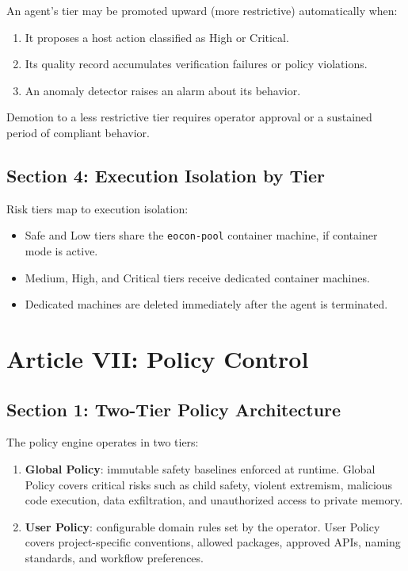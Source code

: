 \documentclass[12pt,letterpaper]{article}
\begin{document}
An agent's tier may be promoted upward (more restrictive) automatically when:

\begin{enumerate}
    \item It proposes a host action classified as High or Critical.
    \item Its quality record accumulates verification failures or policy violations.
    \item An anomaly detector raises an alarm about its behavior.
\end{enumerate}

Demotion to a less restrictive tier requires operator approval or a sustained period of compliant behavior.

\subsection{Section 4: Execution Isolation by Tier}

Risk tiers map to execution isolation:

\begin{itemize}
    \item Safe and Low tiers share the \texttt{eocon-pool} container machine, if container mode is active.
    \item Medium, High, and Critical tiers receive dedicated container machines.
    \item Dedicated machines are deleted immediately after the agent is terminated.
\end{itemize}

\section{Article VII: Policy Control}
\label{art:policy}

\subsection{Section 1: Two-Tier Policy Architecture}

The policy engine operates in two tiers:

\begin{enumerate}
    \item \textbf{Global Policy}: immutable safety baselines enforced at runtime. Global Policy covers critical risks such as child safety, violent extremism, malicious code execution, data exfiltration, and unauthorized access to private memory.
    \item \textbf{User Policy}: configurable domain rules set by the operator. User Policy covers project-specific conventions, allowed packages, approved APIs, naming standards, and workflow preferences.
\end{enumerate}
\end{document}
